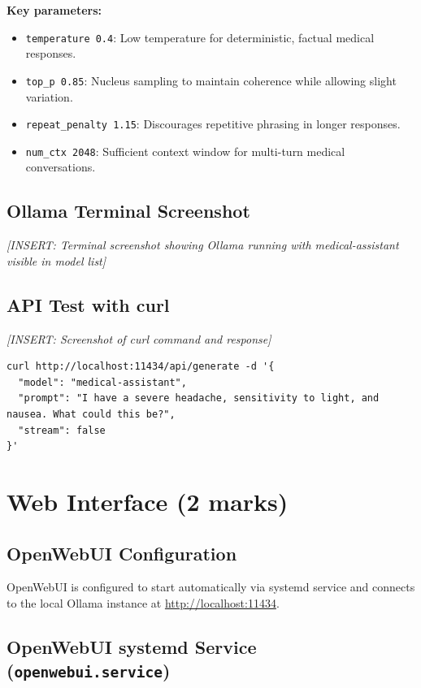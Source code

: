 \documentclass[11pt,a4paper]{article}
\begin{document}
\textbf{Key parameters:}
\begin{itemize}[nosep]
    \item \texttt{temperature 0.4}: Low temperature for deterministic, factual medical responses.
    \item \texttt{top\_p 0.85}: Nucleus sampling to maintain coherence while allowing slight variation.
    \item \texttt{repeat\_penalty 1.15}: Discourages repetitive phrasing in longer responses.
    \item \texttt{num\_ctx 2048}: Sufficient context window for multi-turn medical conversations.
\end{itemize}

\subsection{Ollama Terminal Screenshot}

\textit{[INSERT: Terminal screenshot showing Ollama running with medical-assistant visible in model list]}

\subsection{API Test with curl}

\textit{[INSERT: Screenshot of curl command and response]}

\begin{lstlisting}[style=bash]
curl http://localhost:11434/api/generate -d '{
  "model": "medical-assistant",
  "prompt": "I have a severe headache, sensitivity to light, and nausea. What could this be?",
  "stream": false
}'
\end{lstlisting}

\section{Web Interface (2 marks)}

\subsection{OpenWebUI Configuration}

OpenWebUI is configured to start automatically via systemd service and connects to the local Ollama instance at \url{http://localhost:11434}.

\subsection{OpenWebUI systemd Service (\texttt{openwebui.service})}
\end{document}
